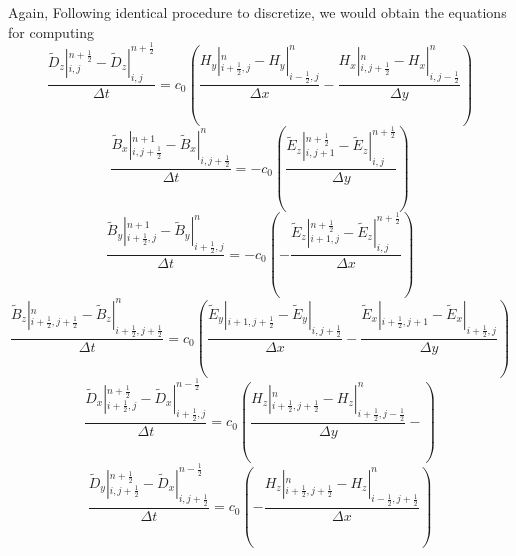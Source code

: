 Again, Following identical procedure to discretize, we would obtain the equations for computing
\begin{displaymath}
  \frac{\widetilde{D}_z|_{i,j}^{n+\frac{1}{2}}-\widetilde{D}_z|_{i,j}^{n+\frac{1}{2}}}{\Delta t} =
  c_0 \left(\frac{H_y|_{i+\frac{1}{2},j}^{n} - H_y|_{i-\frac{1}{2},j}^n}{\Delta x} - \frac{H_x|_{i,j+\frac{1}{2}}^{n} - H_x|_{i,j-\frac{1}{2}}^{n}}{\Delta y}\right)
\end{displaymath}
\begin{displaymath}
  \frac{\widetilde{B}_x|_{i,j+\frac{1}{2}}^{n+1} - \widetilde{B}_x|_{i,j+\frac{1}{2}}^{n}}{\Delta t} = 
  - c_0\left(\frac{\widetilde{E}_z|_{i,j+1}^{n+\frac{1}{2}} - \widetilde{E}_z|_{i,j}^{n+\frac{1}{2}}}{\Delta y}\right)
\end{displaymath}
\begin{displaymath}
  \frac{\widetilde{B}_y|_{i+\frac{1}{2},j}^{n+1} - \widetilde{B}_y|_{i+\frac{1}{2},j}^{n}}{\Delta t} =
  - c_0\left( - \frac{\widetilde{E}_z|_{i+1,j}^{n+\frac{1}{2}} - \widetilde{E}_z|_{i,j}^{n+\frac{1}{2}}}{\Delta x}\right)
\end{displaymath}
\begin{displaymath}
  \frac{\widetilde{B}_z|_{i+\frac{1}{2},j+\frac{1}{2}}^{n} - \widetilde{B}_z|_{i+\frac{1}{2},j+\frac{1}{2}}^{n}}{\Delta t} =
  c_0\left(\frac{\widetilde{E}_y|_{i+1,j+\frac{1}{2}}^{} - \widetilde{E}_y|_{i,j+\frac{1}{2}}^{}}{\Delta x} - \frac{\widetilde{E}_x|_{i+\frac{1}{2},j+1}^{} - \widetilde{E}_x|_{i+\frac{1}{2},j}^{}}{\Delta y}\right)
\end{displaymath}
\begin{displaymath}
  \frac{\widetilde{D}_x|_{i+\frac{1}{2},j}^{n+\frac{1}{2}} - \widetilde{D}_x|_{i+\frac{1}{2},j}^{n-\frac{1}{2}}}{\Delta t} =
  c_0\left(\frac{H_z|_{i+\frac{1}{2},j+\frac{1}{2}}^{n} - H_z|_{i+\frac{1}{2},j-\frac{1}{2}}^{n}}{\Delta y} - \right)
\end{displaymath}
\begin{displaymath}
  \frac{\widetilde{D}_y|_{i,j+\frac{1}{2}}^{n+\frac{1}{2}} - \widetilde{D}_x|_{i,j+\frac{1}{2}}^{n-\frac{1}{2}}}{\Delta t} =
  c_0\left( - \frac{H_z|_{i+\frac{1}{2},j+\frac{1}{2}}^{n} - H_z|_{i-\frac{1}{2},j+\frac{1}{2}}^{n}}{\Delta x}\right)
\end{displaymath}


